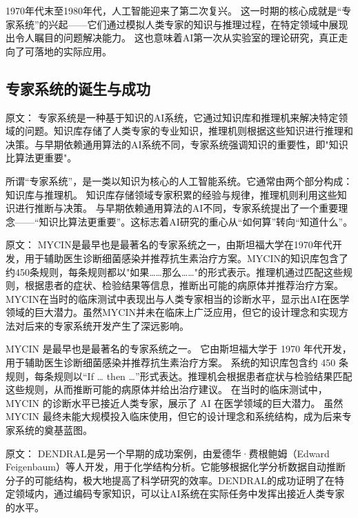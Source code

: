 1970年代末至1980年代，人工智能迎来了第二次复兴。  
这一时期的核心成就是“专家系统”的兴起——它们通过模拟人类专家的知识与推理过程，在特定领域中展现出令人瞩目的问题解决能力。  
这也意味着AI第一次从实验室的理论研究，真正走向了可落地的实际应用。

\subsection{专家系统的诞生与成功}

原文：
专家系统是一种基于知识的AI系统，它通过知识库和推理机来解决特定领域的问题。知识库存储了人类专家的专业知识，推理机则根据这些知识进行推理和决策。与早期依赖通用算法的AI系统不同，专家系统强调知识的重要性，即"知识比算法更重要"。

所谓“专家系统”，是一类以知识为核心的人工智能系统。它通常由两个部分构成：知识库与推理机。  
知识库存储领域专家积累的经验与规律，推理机则利用这些知识进行推断与决策。  
与早期依赖通用算法的AI不同，专家系统提出了一个重要理念——“知识比算法更重要”。这标志着AI研究的重心从“如何算”转向“知道什么”。

原文：
MYCIN是最早也是最著名的专家系统之一，由斯坦福大学在1970年代开发，用于辅助医生诊断细菌感染并推荐抗生素治疗方案。MYCIN的知识库包含了约450条规则，每条规则都以"如果……那么……"的形式表示。推理机通过匹配这些规则，根据患者的症状、检验结果等信息，推断出可能的病原体并推荐治疗方案。MYCIN在当时的临床测试中表现出与人类专家相当的诊断水平，显示出AI在医学领域的巨大潜力。虽然MYCIN并未在临床上广泛应用，但它的设计理念和实现方法对后来的专家系统开发产生了深远影响。

MYCIN 是最早也是最著名的专家系统之一。  
它由斯坦福大学于 1970 年代开发，用于辅助医生诊断细菌感染并推荐抗生素治疗方案。  
系统的知识库包含约 450 条规则，每条规则以“If … then …”形式表达。推理机会根据患者症状与检验结果匹配这些规则，从而推断可能的病原体并给出治疗建议。  
在当时的临床测试中，MYCIN 的诊断水平已接近人类专家，展示了 AI 在医学领域的巨大潜力。  
虽然 MYCIN 最终未能大规模投入临床使用，但它的设计理念和系统结构，成为后来专家系统的奠基蓝图。

原文：
DENDRAL是另一个早期的成功案例，由爱德华·费根鲍姆（Edward Feigenbaum）等人开发，用于化学结构分析。它能够根据化学分析数据自动推断分子的可能结构，极大地提高了科学研究的效率。DENDRAL的成功证明了在特定领域内，通过编码专家知识，可以让AI系统在实际任务中发挥出接近人类专家的水平。

